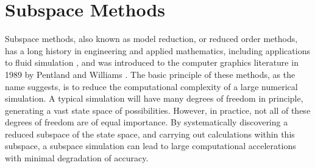 \section{Subspace Methods}
\label{sec:subspace}
Subspace methods, also known as model reduction, or reduced order methods, has a long history in engineering and applied mathematics, including applications to fluid simulation \cite{lumley1967}, and was introduced to the computer graphics literature in 1989 by Pentland and Williams \cite{Pentland:1989:GVM, Berkooz93theproper}. The basic principle of these methods, as the name suggests, is to reduce the computational complexity of a large numerical simulation. A typical simulation will have many degrees of freedom in principle, generating a vast state space of possibilities. However, in practice, not all of these degrees of freedom are of equal importance. By systematically discovering a reduced subspace of the state space, and carrying out calculations within this subspace, a subspace simulation can lead to large computational accelerations with minimal degradation of accuracy.

